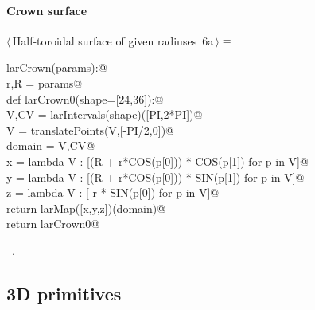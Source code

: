 \documentclass[11pt,oneside]{article}	%
\begin{document}
\paragraph{Crown surface}
\begin{flushleft} \small \label{scrap12}
\protect{}$\langle\,$Half-toroidal surface of given radiuses\nobreak\ {\footnotesize 6a}$\,\rangle\equiv$
\vspace{-1ex}
\begin{list}{}{} \item
\mbox{}\verb@def larCrown(params):@\\
\mbox{}\verb@   r,R = params@\\
\mbox{}\verb@   def larCrown0(shape=[24,36]):@\\
\mbox{}\verb@      V,CV = larIntervals(shape)([PI,2*PI])@\\
\mbox{}\verb@      V = translatePoints(V,[-PI/2,0])@\\
\mbox{}\verb@      domain = V,CV@\\
\mbox{}\verb@      x = lambda V : [(R + r*COS(p[0])) * COS(p[1]) for p in V]@\\
\mbox{}\verb@      y = lambda V : [(R + r*COS(p[0])) * SIN(p[1]) for p in V]@\\
\mbox{}\verb@      z = lambda V : [-r * SIN(p[0]) for p in V]@\\
\mbox{}\verb@      return larMap([x,y,z])(domain)@\\
\mbox{}\verb@   return larCrown0@\\
\mbox{}\verb@@{\NWsep}
\end{list}
\vspace{-1ex}
\footnotesize\addtolength{\baselineskip}{-1ex}
\begin{list}{}{\setlength{\itemsep}{-\parsep}\setlength{\itemindent}{-\leftmargin}}
\item \NWtxtMacroRefIn\ .
\end{list}
\end{flushleft}

\subsection{3D primitives}
\end{document}
